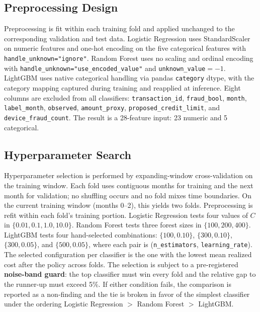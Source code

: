 \documentclass[conference]{IEEEtran}
\begin{document}
\subsection{Preprocessing Design}

Preprocessing is fit within each training fold and applied unchanged to the
corresponding validation and test data. Logistic Regression uses
StandardScaler on numeric features and one-hot encoding on the five
categorical features with \texttt{handle\_unknown="ignore"}. Random Forest
uses no scaling and ordinal encoding with
\texttt{handle\_unknown="use\_encoded\_value"} and
\texttt{unknown\_value}$=-1$. LightGBM uses native categorical handling via
pandas \texttt{category} dtype, with the category mapping captured during
training and reapplied at inference. Eight columns are excluded from all
classifiers: \texttt{transaction\_id}, \texttt{fraud\_bool},
\texttt{month}, \texttt{label\_month}, \texttt{observed},
\texttt{amount\_proxy}, \texttt{proposed\_credit\_limit}, and
\texttt{device\_fraud\_count}. The result is a 28-feature input: 23 numeric
and 5 categorical.

\subsection{Hyperparameter Search}

Hyperparameter selection is performed by expanding-window cross-validation
on the training window. Each fold uses contiguous months for training and
the next month for validation; no shuffling occurs and no fold mixes time
boundaries. On the current training window (months 0--2), this yields two
folds. Preprocessing is refit within each fold's training portion. Logistic
Regression tests four values of $C$ in $\{0.01, 0.1, 1.0, 10.0\}$. Random
Forest tests three forest sizes in $\{100, 200, 400\}$. LightGBM tests four
hand-selected combinations: $\{100, 0.10\}$, $\{300, 0.10\}$,
$\{300, 0.05\}$, and $\{500, 0.05\}$, where each pair is
(\texttt{n\_estimators}, \texttt{learning\_rate}). The selected
configuration per classifier is the one with the lowest mean realized cost
after the policy across folds. The selection is subject to a pre-registered
\textbf{noise-band guard}: the top classifier must win every fold and the
relative gap to the runner-up must exceed 5\%. If either condition fails,
the comparison is reported as a non-finding and the tie is broken in favor
of the simplest classifier under the ordering Logistic Regression $>$
Random Forest $>$ LightGBM.
\end{document}
